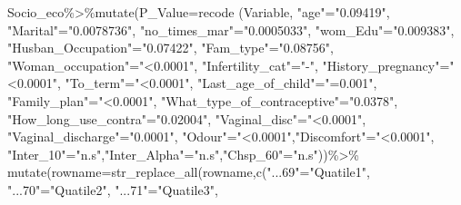 \documentclass[
]{article}
\newenvironment{Shaded}{\begin{snugshade}}{\end{snugshade}}
\newcommand{\AttributeTok}[1]{\textcolor[rgb]{0.77,0.63,0.00}{#1}}
\newcommand{\FunctionTok}[1]{\textcolor[rgb]{0.00,0.00,0.00}{#1}}
\newcommand{\NormalTok}[1]{#1}
\newcommand{\OtherTok}[1]{\textcolor[rgb]{0.56,0.35,0.01}{#1}}
\newcommand{\SpecialCharTok}[1]{\textcolor[rgb]{0.00,0.00,0.00}{#1}}
\newcommand{\StringTok}[1]{\textcolor[rgb]{0.31,0.60,0.02}{#1}}
\begin{document}
\begin{Shaded}
\begin{Highlighting}[]
\NormalTok{Socio\_eco}\SpecialCharTok{\%\textgreater{}\%}\FunctionTok{mutate}\NormalTok{(}\AttributeTok{P\_Value=}\NormalTok{recode}
\NormalTok{                   (Variable,}
                     \StringTok{"age"}\OtherTok{=}\StringTok{"0.09419"}\NormalTok{,}
                     \StringTok{"Marital"}\OtherTok{=}\StringTok{"0.0078736"}\NormalTok{,}
                     \StringTok{"no\_times\_mar"}\OtherTok{=}\StringTok{"0.0005033"}\NormalTok{,}
                     \StringTok{"wom\_Edu"}\OtherTok{=}\StringTok{"0.009383"}\NormalTok{,}
                     \StringTok{"Husban\_Occupation"}\OtherTok{=}\StringTok{"0.07422"}\NormalTok{,}
                     \StringTok{"Fam\_type"}\OtherTok{=}\StringTok{"0.08756"}\NormalTok{,}
                     \StringTok{"Woman\_occupation"}\OtherTok{=}\StringTok{"\textless{}0.0001"}\NormalTok{,}
                     \StringTok{"Infertility\_cat"}\OtherTok{=}\StringTok{"{-}"}\NormalTok{,}
                     \StringTok{"History\_pregnancy"}\OtherTok{=}\StringTok{"\textless{}0.0001"}\NormalTok{,}
                     \StringTok{"To\_term"}\OtherTok{=}\StringTok{"\textless{}0.0001"}\NormalTok{,}
                     \StringTok{"Last\_age\_of\_child"}\OtherTok{=}\StringTok{"=0.001"}\NormalTok{,}
                     \StringTok{"Family\_plan"}\OtherTok{=}\StringTok{"\textless{}0.0001"}\NormalTok{,}
                     \StringTok{"What\_type\_of\_contraceptive"}\OtherTok{=}\StringTok{"0.0378"}\NormalTok{,}
                     \StringTok{"How\_long\_use\_contra"}\OtherTok{=}\StringTok{"0.02004"}\NormalTok{,}
                     \StringTok{"Vaginal\_disc"}\OtherTok{=}\StringTok{"\textless{}0.0001"}\NormalTok{,}
                     \StringTok{"Vaginal\_discharge"}\OtherTok{=}\StringTok{"0.0001"}\NormalTok{,}
                     \StringTok{"Odour"}\OtherTok{=}\StringTok{"\textless{}0.0001"}\NormalTok{,}\StringTok{"Discomfort"}\OtherTok{=}\StringTok{"\textless{}0.0001"}\NormalTok{,}
                     \StringTok{"Inter\_10"}\OtherTok{=}\StringTok{"n.s"}\NormalTok{,}\StringTok{"Inter\_Alpha"}\OtherTok{=}\StringTok{"n.s"}\NormalTok{,}\StringTok{"Chsp\_60"}\OtherTok{=}\StringTok{"n.s"}\NormalTok{))}\SpecialCharTok{\%\textgreater{}\%}
 \FunctionTok{mutate}\NormalTok{(}\AttributeTok{rowname=}\FunctionTok{str\_replace\_all}\NormalTok{(rowname,}\FunctionTok{c}\NormalTok{(}\StringTok{"...69"}\OtherTok{=}\StringTok{"Quatile1"}\NormalTok{,}
                                          \StringTok{"...70"}\OtherTok{=}\StringTok{"Quatile2"}\NormalTok{,}
                                          \StringTok{"...71"}\OtherTok{=}\StringTok{"Quatile3"}\NormalTok{,}

\end{Highlighting}
\end{Shaded}
\end{document}
